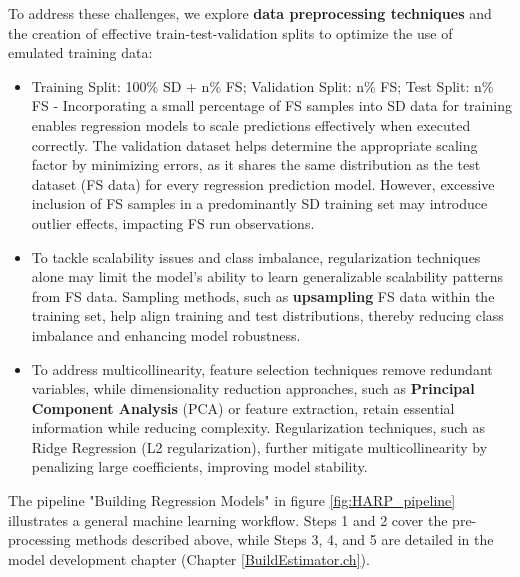 To address these challenges, we explore \textbf{data preprocessing techniques} and the creation of effective train-test-validation splits to optimize the use of emulated training data:
\begin{itemize}
    \item Training Split: 100\% SD + n\% FS; Validation Split: n\% FS; Test Split: n\% FS - Incorporating a small percentage of FS samples into SD data for training enables regression models to scale predictions effectively when executed correctly. The validation dataset helps determine the appropriate scaling factor by minimizing errors, as it shares the same distribution as the test dataset (FS data) for every regression prediction model. However, excessive inclusion of FS samples in a predominantly SD training set may introduce outlier effects, impacting FS run observations.
    \item To tackle scalability issues and class imbalance, regularization techniques alone may limit the model's ability to learn generalizable scalability patterns from FS data. Sampling methods, such as \textbf{upsampling} FS data within the training set, help align training and test distributions, thereby reducing class imbalance and enhancing model robustness.
    \item To address multicollinearity, feature selection techniques remove redundant variables, while dimensionality reduction approaches, such as \textbf{Principal Component Analysis} (PCA) or feature extraction, retain essential information while reducing complexity. Regularization techniques, such as Ridge Regression (L2 regularization), further mitigate multicollinearity by penalizing large coefficients, improving model stability.

\end{itemize}

The pipeline "Building Regression Models" in figure \ref{fig:HARP_pipeline} illustrates a general machine learning workflow. Steps 1 and 2 cover the pre-processing methods described above, while Steps 3, 4, and 5 are detailed in the model development chapter (Chapter \ref{BuildEstimator.ch}).





